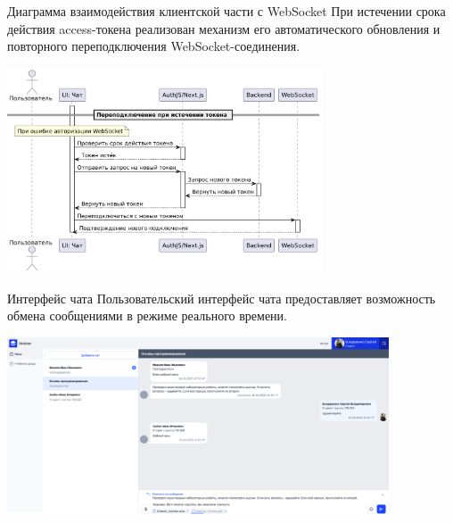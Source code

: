 \documentclass[aspectratio=169]{beamer}
\begin{document}
\begin{frame}{Диаграмма взаимодействия клиентской части с WebSocket}
\small
\justifying
При истечении срока действия access-токена реализован механизм его автоматического обновления и повторного переподключения WebSocket-соединения.

\vspace{0.5em}

\centering
\includegraphics[width=0.7\textwidth]{static/WsReconnectSequence.png}
\end{frame}

\begin{frame}{Интерфейс чата}
\small
\justifying
Пользовательский интерфейс чата предоставляет возможность обмена сообщениями в режиме реального времени.

\vspace{1em}

\centering
\includegraphics[width=0.85\textwidth]{static/ChatsStudentPage.png}
\end{frame}

%
%
\end{document}
